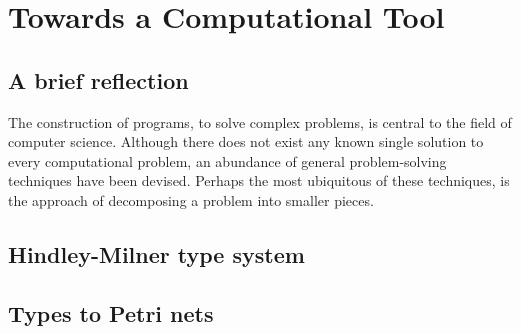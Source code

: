 \documentclass[../Dissertation.tex]{subfiles}
\begin{document}
\section{Towards a Computational Tool}
\subsection{A brief reflection}
The construction of programs, to solve complex problems, is central to the field of computer science. Although there does not exist any known single solution to every computational problem, an abundance of general problem-solving techniques have been devised. Perhaps the most ubiquitous of these techniques, is the approach of decomposing a problem into smaller pieces. 

\subsection{Hindley-Milner type system}

\subsection{Types to Petri nets}


\end{document}
